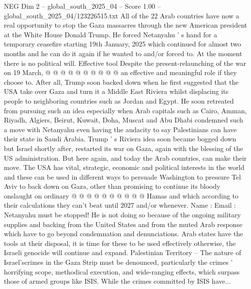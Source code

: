 \begin{textsample}{NEG Dim 2 – global\_south\_2025\_04 – Score 1.00 – global\_south\_2025\_04/123226515.txt}
All of the 22 Arab countries have now a real opportunity to stop the Gaza massacres through the new American president at the White House Donald Trump.
He forced Netanyahu ' s hand for a temporary ceasefire starting 19th January, 2025 which continued for almost two months and he can do it again if he wanted to and/or forced to.
At the moment there is no political will.
Effective tool Despite the present-relaunching of the war on 19 March, @ @ @ @ @ @ @ @ @ @ an effective and meaningful role if they choose to.
After all, Trump soon backed down when he first suggested that the USA take over Gaza and turn it a Middle East Riviera whilst displacing its people to neighboring countries such as Jordan and Egypt.
He soon retreated from pursuing such an idea especially when Arab capitals such as Cairo, Amman, Riyadh, Algiers, Beirut, Kuwait, Doha, Muscat and Abu Dhabi condemned such a move with Netanyahu even having the audacity to say Palestinians can have their state in Saudi Arabia.
Trump ' s Riviera idea soon became bogged down but Israel shortly after, restarted its war on Gaza, again with the blessing of the US administration.
But here again, and today the Arab countries, can make their move.
The USA has vital, strategic, economic and political interests in the world and these can be used in different ways to persuade Washington to pressure Tel Aviv to back down on Gaza, other than promising to continue its bloody onslaught on ordinary @ @ @ @ @ @ @ @ @ @ Hamas and which according to their calculations they can't beat until 2027 and/or whenever.
Name : Email : Netanyahu must be stopped!
He is not doing so because of the ongoing military supplies and backing from the United States and from the muted Arab response which have to go beyond condemnation and denunciations.
Arab states have the tools at their disposal, it is time for these to be used effectively otherwise, the Israeli genocide will continue and expand.
Palestinian Territory -- The nature of Israel'scrimes in the Gaza Strip must be denounced, particularly the crimes ' horrifying scope, methodical execution, and wide-ranging effects, which surpass those of armed groups like ISIS.
While the crimes committed by ISIS have...

\end{textsample}
